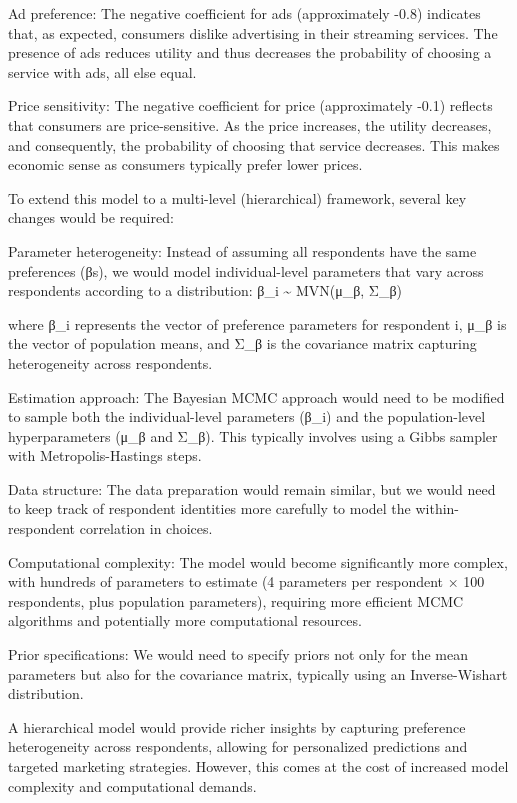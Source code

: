 \documentclass[
  letterpaper,
  DIV=11,
  numbers=noendperiod]{scrartcl}
\begin{document}
Ad preference: The negative coefficient for ads (approximately -0.8)
indicates that, as expected, consumers dislike advertising in their
streaming services. The presence of ads reduces utility and thus
decreases the probability of choosing a service with ads, all else
equal.

Price sensitivity: The negative coefficient for price (approximately
-0.1) reflects that consumers are price-sensitive. As the price
increases, the utility decreases, and consequently, the probability of
choosing that service decreases. This makes economic sense as consumers
typically prefer lower prices.

To extend this model to a multi-level (hierarchical) framework, several
key changes would be required:

Parameter heterogeneity: Instead of assuming all respondents have the
same preferences (βs), we would model individual-level parameters that
vary across respondents according to a distribution: β\_i
\textasciitilde{} MVN(μ\_β, Σ\_β)

where β\_i represents the vector of preference parameters for respondent
i, μ\_β is the vector of population means, and Σ\_β is the covariance
matrix capturing heterogeneity across respondents.

Estimation approach: The Bayesian MCMC approach would need to be
modified to sample both the individual-level parameters (β\_i) and the
population-level hyperparameters (μ\_β and Σ\_β). This typically
involves using a Gibbs sampler with Metropolis-Hastings steps.

Data structure: The data preparation would remain similar, but we would
need to keep track of respondent identities more carefully to model the
within-respondent correlation in choices.

Computational complexity: The model would become significantly more
complex, with hundreds of parameters to estimate (4 parameters per
respondent × 100 respondents, plus population parameters), requiring
more efficient MCMC algorithms and potentially more computational
resources.

Prior specifications: We would need to specify priors not only for the
mean parameters but also for the covariance matrix, typically using an
Inverse-Wishart distribution.

A hierarchical model would provide richer insights by capturing
preference heterogeneity across respondents, allowing for personalized
predictions and targeted marketing strategies. However, this comes at
the cost of increased model complexity and computational demands.
\end{document}
